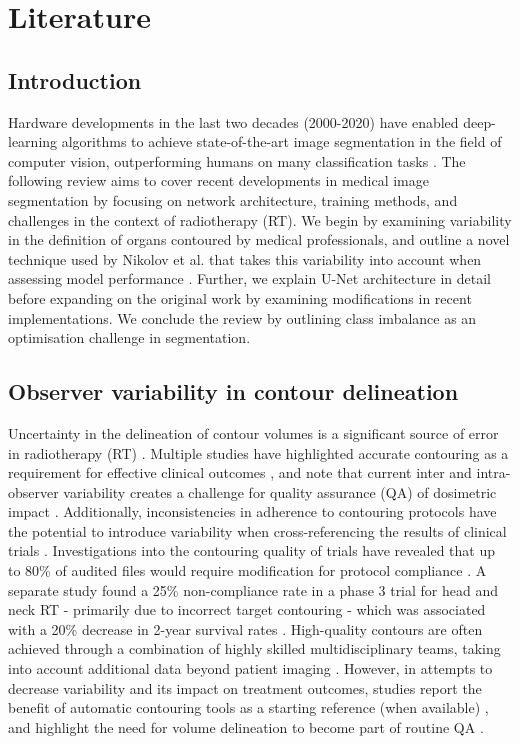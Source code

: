 \chapter{Literature} \label{ch:literature}

\section{Introduction}
Hardware developments in the last two decades (2000-2020) have enabled deep-learning algorithms to achieve state-of-the-art image segmentation in the field of computer vision, outperforming humans on many classification tasks \cite{ioffe2015, He2015, Wu2015}. The following review aims to cover recent developments in medical image segmentation by focusing on network architecture, training methods, and challenges in the context of radiotherapy (RT). We begin by examining variability in the definition of organs contoured by medical professionals, and outline a novel technique used by Nikolov et al. that takes this variability into account when assessing model performance \cite{Nikolov_2018}. Further, we explain U-Net architecture in detail before expanding on the original work by examining modifications in recent implementations. We conclude the review by outlining class imbalance as an optimisation challenge in segmentation.


\section{Observer variability in contour delineation}
 
Uncertainty in the delineation of contour volumes is a significant source of error in radiotherapy (RT) \cite{Nikolov_2018}. Multiple studies have highlighted accurate contouring as a requirement for effective clinical outcomes \cite{Vinod_2016, Roach_2019, Nemoto_2020}, and note that current inter and intra-observer variability creates a challenge for quality assurance (QA) of dosimetric impact \cite{Vinod_2016}. Additionally, inconsistencies in adherence to contouring protocols have the potential to introduce variability when cross-referencing the results of clinical trials \cite{Roach_2019}. Investigations into the contouring quality of trials have revealed that up to 80\% of audited files would require modification for protocol compliance \cite{Kachnic2013}. A separate study found a 25\% non-compliance rate in a phase 3 trial for head and neck RT - primarily due to incorrect target contouring - which was associated with a 20\% decrease in 2-year survival rates \cite{Peters2010}. High-quality contours are often achieved through a combination of highly skilled multidisciplinary teams, taking into account additional data beyond patient imaging \cite{Vinod_2016, Roach_2019}. However, in attempts to decrease variability and its impact on treatment outcomes, studies report the benefit of automatic contouring tools as a starting reference (when available) \cite{Vinod_2016}, and highlight the need for volume delineation to become part of routine QA \cite{Vinod_2016}. 

